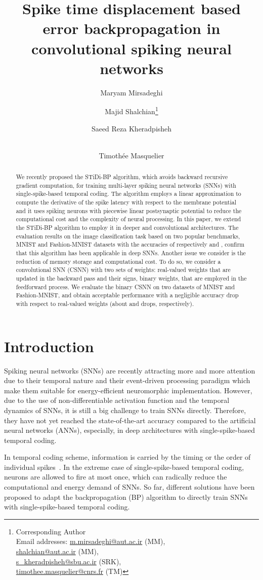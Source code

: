 \documentclass[preprint,twocolumn,5p,12pt]{article}
\title{Spike time displacement based error backpropagation in convolutional spiking neural networks}\author{Maryam Mirsadeghi}
\author{Majid Shalchian\footnote{Corresponding Author \\Email addresses: \href{mailto://m.mirsadeghi@aut.ac.ir}{m.mirsadeghi@aut.ac.ir} (MM), \\ \href{mailto:// shalchian@aut.ac.ir}{ shalchian@aut.ac.ir} (MM), \\
\href{mailto:// s\_kheradpisheh@sbu.ac.ir}{ s\_kheradpisheh@sbu.ac.ir} (SRK), \\
\href{mailto:/timothee.masquelier@cnrs.fr}{timothee.masquelier@cnrs.fr} (TM)} }
\author{Saeed Reza Kheradpisheh}
\author{\\Timoth\'ee Masquelier}
\affil{\footnotesize  Department of Electrical Engineering, Amirkabir University of Technology, Tehran, Iran}
\affil{\footnotesize  Department of Computer and data Sciences, Shahid Beheshti University, Tehran, Iran}
\affil{\footnotesize   CerCo UMR 5549, CNRS Universit\'e Toulouse 3, France}
\date{}
\begin{document}
\maketitle


\begin{abstract}
We recently proposed the STiDi-BP algorithm, which avoids backward recursive gradient computation, for training multi-layer spiking neural networks (SNNs) with single-spike-based temporal coding. The algorithm employs a linear approximation to compute the derivative of the spike latency with respect to the membrane potential and it uses spiking neurons with piecewise linear postsynaptic potential to reduce the computational cost and the complexity of neural processing.
In this paper, we extend the STiDi-BP algorithm to employ it in deeper and convolutional architectures. The evaluation results on the image classification task based on two popular benchmarks, MNIST and Fashion-MNIST datasets with the accuracies of respectively  and , confirm that this algorithm has been applicable in deep SNNs.
Another issue we consider is the reduction of memory storage and computational cost.
To do so, we consider a convolutional SNN (CSNN) with two sets of weights: real-valued weights that are updated in the backward pass and their signs, binary weights, that are employed in the feedforward process.
We evaluate the binary CSNN on two datasets of MNIST and Fashion-MNIST, and obtain acceptable performance with a negligible accuracy drop with respect to real-valued weights (about  and  drops, respectively).
\end{abstract}





\section{Introduction}
Spiking neural networks (SNNs) are recently attracting more and more attention due to their temporal nature and their event-driven processing paradigm which make them suitable for energy-efficient neuromorphic implementation.
However, due to the use of non-differentiable activation function and the temporal dynamics of SNNs, it is still a big challenge to train SNNs directly. Therefore, they have not yet reached the state-of-the-art accuracy compared to the artificial neural networks (ANNs), especially, in deep architectures with single-spike-based temporal coding. 


In temporal coding scheme, information is carried by the timing or the order of individual spikes~\cite{K1,K2,K3}. In the extreme case of single-spike-based temporal coding, neurons are allowed to fire at most once, which can radically reduce the computational and energy demand of SNNs.
So far, different solutions have been proposed to adapt the backpropagation (BP) algorithm to directly train SNNs with single-spike-based temporal coding.
\end{document}
